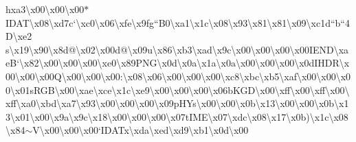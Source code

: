 \begin{DoxyCompactItemize}
h{}xa3\textbackslash{}x00\textbackslash{}x00\textbackslash{}x00$\ast$\+I\+D\+A\+T\textbackslash{}x08\textbackslash{}xd7c`\textbackslash{}xc0\textbackslash{}x06\textbackslash{}xfe\textbackslash{}x9fg``\+B0\textbackslash{}xa1\textbackslash{}x1c\textbackslash{}x08\textbackslash{}x93\textbackslash{}x81\textbackslash{}x81\textbackslash{}x09\textbackslash{}xc1d``b``4\+D\textbackslash{}xe2 s\textbackslash{}x19\textbackslash{}x90\textbackslash{}x8d@\textbackslash{}x02\textbackslash{}x00d@\textbackslash{}x09u\textbackslash{}x86\textbackslash{}xb3\textbackslash{}xad\textbackslash{}x9c\textbackslash{}x00\textbackslash{}x00\textbackslash{}x00\textbackslash{}x00\+I\+E\+N\+D\textbackslash{}xae\+B`\textbackslash{}x82\textbackslash{}x00\textbackslash{}x00\textbackslash{}x00\textbackslash{}xe0\textbackslash{}x89\+P\+N\+G\textbackslash{}x0d\textbackslash{}x0a\textbackslash{}x1a\textbackslash{}x0a\textbackslash{}x00\textbackslash{}x00\textbackslash{}x00\textbackslash{}x0d\+I\+H\+D\+R\textbackslash{}x00\textbackslash{}x00\textbackslash{}x00\+Q\textbackslash{}x00\textbackslash{}x00\textbackslash{}x00\+:\textbackslash{}x08\textbackslash{}x06\textbackslash{}x00\textbackslash{}x00\textbackslash{}x00\textbackslash{}xc8\textbackslash{}xbc\textbackslash{}xb5\textbackslash{}xaf\textbackslash{}x00\textbackslash{}x00\textbackslash{}x00\textbackslash{}x01s\+R\+G\+B\textbackslash{}x00\textbackslash{}xae\textbackslash{}xce\textbackslash{}x1c\textbackslash{}xe9\textbackslash{}x00\textbackslash{}x00\textbackslash{}x00\textbackslash{}x06b\+K\+G\+D\textbackslash{}x00\textbackslash{}xff\textbackslash{}x00\textbackslash{}xff\textbackslash{}x00\textbackslash{}xff\textbackslash{}xa0\textbackslash{}xbd\textbackslash{}xa7\textbackslash{}x93\textbackslash{}x00\textbackslash{}x00\textbackslash{}x00\textbackslash{}x09p\+H\+Ys\textbackslash{}x00\textbackslash{}x00\textbackslash{}x0b\textbackslash{}x13\textbackslash{}x00\textbackslash{}x00\textbackslash{}x0b\textbackslash{}x13\textbackslash{}x01\textbackslash{}x00\textbackslash{}x9a\textbackslash{}x9c\textbackslash{}x18\textbackslash{}x00\textbackslash{}x00\textbackslash{}x00\textbackslash{}x07t\+I\+M\+E\textbackslash{}x07\textbackslash{}xdc\textbackslash{}x08\textbackslash{}x17\textbackslash{}x0b)\textbackslash{}x1c\textbackslash{}x08\textbackslash{}x84$\sim$\+V\textbackslash{}x00\textbackslash{}x00\textbackslash{}x00`\+I\+D\+A\+Tx\textbackslash{}xda\textbackslash{}xed\textbackslash{}xd9\textbackslash{}xb1\textbackslash{}x0d\textbackslash{}x00 
\end{DoxyCompactItemize}

